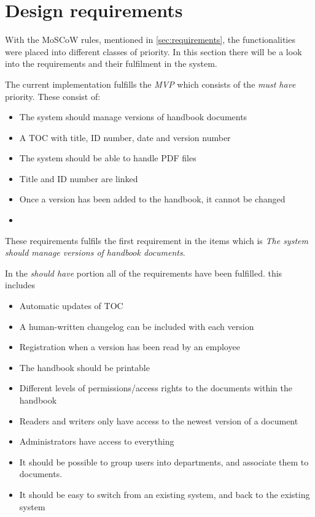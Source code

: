 \section{Design requirements}\label{sec:disdesignrequirements}
With the MoSCoW rules, mentioned in \cref{sec:requirements}, the functionalities were placed into different classes of priority.
In this section there will be a look into the requirements and their fulfilment in the system.

The current implementation fulfills the \textit{MVP} which consists of the \textit{must have} priority.
These consist of:

\begin{itemize}
	\item
	The system should manage versions of handbook documents
	\item
    A TOC with title, ID number, date and version number
    \item
    The system should be able to handle PDF files
    \item
    Title and ID number are linked
    \item
    Once a version has been added to the handbook, it cannot be changed
	\item
\end{itemize}

These requirements fulfils the first requirement in the items which is \textit{The system should manage versions of handbook documents}.

In the \textit{should have} portion all of the requirements have been fulfilled.
this includes

\begin{itemize}
	\item
	Automatic updates of TOC
    \item
	A human-written changelog can be included with each version
	\item
    Registration when a version has been read by an employee
    \item
    The handbook should be printable
    \item
   	Different levels of permissions/access rights to the documents within the handbook
    \item
    Readers and writers only have access to the newest version of a document
    \item
    Administrators have access to everything
   	\item
    It should be possible to group users into departments, and associate them to documents.
    \item
    It should be easy to switch from an existing system, and back to the existing system
\end{itemize}


